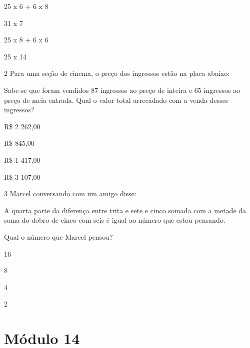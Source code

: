\begin{escolha}
\item
  25 x 6 + 6 x 8
\item
  31 x 7
\item
  25 x 8 + 6 x 6
\item
  25 x 14
\end{escolha}


\num{2} Para uma seção de cinema, o preço dos ingressos estão na placa
abaixo:


Sabe-se que foram vendidos 87 ingressos ao preço de inteira e 65
ingressos ao preço de meia entrada. Qual o valor total arrecadado com a
venda desses ingressos?

\begin{escolha}
\item
  R\$ 2 262,00
\item
  R\$ 845,00
\item
  R\$ 1 417,00
\item
  R\$ 3 107,00
\end{escolha}


\num{3} Marcel conversando com um amigo disse:

A quarta parte da diferença entre trita e sete e cinco somada com a
metade da soma do dobro de cinco com seis é igual ao número que estou
pensando.


Qual o número que Marcel pensou?

\begin{escolha}
\item
  16
\item
  8
\item
  4
\item
  2
\end{escolha}


\chapter{Módulo 14}

